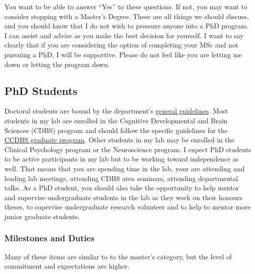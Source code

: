 \documentclass{article}
\begin{document}
\begin{description}
You want to be able to answer ``Yes'' to these questions. If not, you may want to consider stopping with a Master's Degree. These are all things we should discuss, and you should know that I do not wish to pressure anyone into a PhD program. I can assist and advise as you make the best decision for yourself. I want to say clearly that if you are considering the option of completing your MSc and not pursuing a PhD, I will be supportive. Please do not feel like you are letting me down or letting the program down.  
\end{description}


\subsection {PhD Students}
Doctoral students are bound by the department's \href{http://psychology.uwo.ca/graduate/index.html}{general guidelines}. Most students in my lab are enrolled in the Cognitive Developmental and Brain Sciences (CDBS) program and should follow the specific guidelines for the \href{http://psychology.uwo.ca/graduate/program_information/cdbs_program_requirements.html}{CCDBS graduate program}. Other students in my lab may be enrolled in the Clinical Psychology program or the Neuroscience program. I expect PhD students to be active participants in my lab but to be working toward independence as well. That means that you are spending time in the lab, your are attending and leading lab meetings, attending CDBS area seminars, attending departmental talks. As a PhD student, you should also take the opportunity to help mentor and supervise undergraduate students in the lab as they work on their honours theses, to supervise undergraduate research volunteer and to help to mentor more junior graduate students.

\subsubsection{Milestones and Duties}
Many of these items are similar to to the master's category, but the level of commitment and expectations are higher. 
\end{document}
